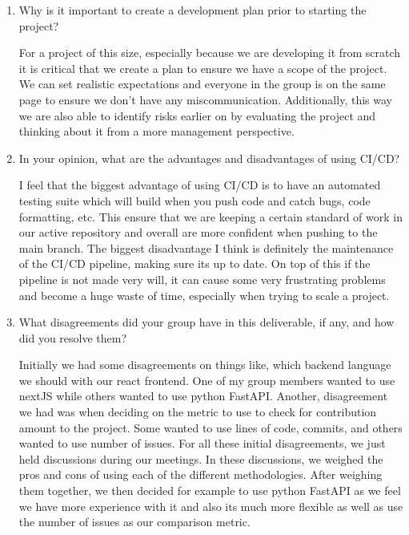 \documentclass{article}
\begin{document}
\begin{enumerate}
    \item Why is it important to create a development plan prior to starting
          the project?

          For a project of this size, especially because we are developing it
          from scratch it is critical that we create a plan to ensure we have a
          scope of the project. We can set realistic expectations and everyone
          in the group is on the same page to ensure we don't have any
          miscommunication. Additionally, this way we are also able to identify
          risks earlier on by evaluating the project and thinking about it from
          a more management perspective.

    \item In your opinion, what are the advantages and disadvantages of using
          CI/CD?

          I feel that the biggest advantage of using CI/CD is to have an
          automated testing suite which will build when you push code and catch
          bugs, code formatting, etc. This ensure that we are keeping a certain
          standard of work in our active repository and overall are more
          confident when pushing to the main branch. The biggest disadvantage I
          think is definitely the maintenance of the CI/CD pipeline, making
          sure its up to date. On top of this if the pipeline is not made very
          will, it can cause some very frustrating problems and become a huge
          waste of time, especially when trying to scale a project.

    \item What disagreements did your group have in this deliverable, if any,
          and how did you resolve them?

          Initially we had some disagreements on things like, which backend
          language we should with our react frontend. One of my group members
          wanted to use nextJS while others wanted to use python FastAPI.
          Another, disagreement we had was when deciding on the metric to use
          to check for contribution amount to the project. Some wanted to use
          lines of code, commits, and others wanted to use number of issues.
          For all these initial disagreements, we just held discussions during
          our meetings. In these discussions, we weighed the pros and cons of
          using each of the different methodologies. After weighing them
          together, we then decided for example to use python FastAPI as we
          feel we have more experience with it and also its much more flexible
          as well as use the number of issues as our comparison metric.
\end{enumerate}
\end{document}
